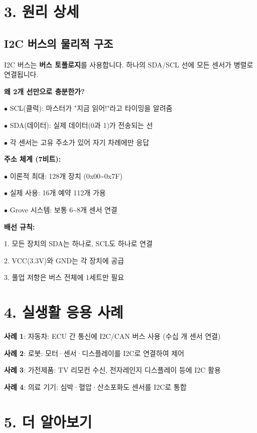 \documentclass[11pt,a4paper]{article}
\begin{document}
\section*{3. 원리 상세}

\subsection*{I2C 버스의 물리적 구조}

I2C 버스는 \textbf{버스 토폴로지}를 사용합니다. 하나의 SDA/SCL 선에 모든 센서가 병렬로 연결됩니다.


\textbf{왜 2개 선만으로 충분한가?}

$\bullet$ SCL(클럭): 마스터가 "지금 읽어!"라고 타이밍을 알려줌

$\bullet$ SDA(데이터): 실제 데이터(0과 1)가 전송되는 선

$\bullet$ 각 센서는 고유 주소가 있어 자기 차례에만 응답


\textbf{주소 체계 (7비트):}

$\bullet$ 이론적 최대: 128개 장치 (0x00\textasciitilde{}0x7F)

$\bullet$ 실제 사용: 16개 예약 \textrightarrow{} 112개 가용

$\bullet$ Grove 시스템: 보통 6\textasciitilde{}8개 센서 연결


\textbf{배선 규칙:}

1. 모든 장치의 SDA는 하나로, SCL도 하나로 연결

2. VCC(3.3V)와 GND는 각 장치에 공급

3. 풀업 저항은 버스 전체에 1세트만 필요



\section*{4. 실생활 응용 사례}

\textbf{사례 1}: 자동차: ECU 간 통신에 I2C/CAN 버스 사용 (수십 개 센서 연결)


\textbf{사례 2}: 로봇: 모터·센서·디스플레이를 I2C로 연결하여 제어


\textbf{사례 3}: 가전제품: TV 리모컨 수신, 전자레인지 디스플레이 등에 I2C 활용


\textbf{사례 4}: 의료 기기: 심박·혈압·산소포화도 센서를 I2C로 통합



\section*{5. 더 알아보기}
\end{document}
